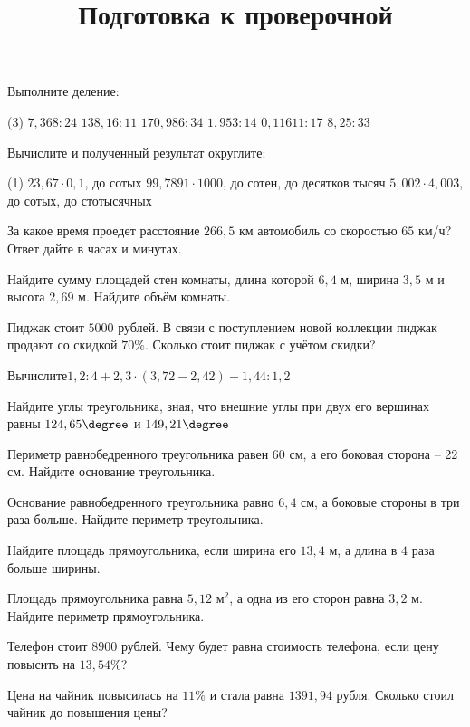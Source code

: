 \begin{homework}[number=3]
	\begin{listofex}
		\item Выполните деление:
		\begin{tasks}(3)
			\task \( 7,368: 24 \)
			\task \( 138,16:11 \) 
			\task \( 170,986:34 \)  
			\task \( 1,953:14 \)  
			\task \( 0,11611:17 \)  
			\task \( 8,25:33 \)  
		\end{tasks}
		\item Вычислите и полученный результат округлите: 
		\begin{tasks}(1)
			\task \( 23,67\cdot 0,1 \), до сотых
			\task \( 99,7891\cdot 1000  \), до сотен, до десятков тысяч
			\task \( 5,002 \cdot4,003 \), до сотых, до стотысячных
		\end{tasks}
		\item  За какое время проедет расстояние \( 266,5 \) км автомобиль со скоростью \( 65 \) км/ч? Ответ дайте в 
		часах и минутах.
		\item Найдите сумму площадей стен комнаты, длина которой \( 6,4 \) м, ширина \( 3,5 \) м и высота \( 2,69 \) м. Найдите объём комнаты.
		\item  Пиджак стоит \( 5000 \) рублей. В связи с поступлением новой коллекции пиджак продают со скидкой \( 70\% \). Сколько стоит пиджак с учётом скидки?
		
	\end{listofex}
\end{homework}

\begin{class}[number=7]
	\title{Подготовка к проверочной}
	\begin{listofex}
		\item Вычислите\( 1,2:4+2,3\cdot(3,72-2,42)-1,44:1,2 \) 
		\item Найдите углы треугольника, зная, что внешние углы при двух его вершинах равны \( 124,65\degree \) и \( 149,21\degree \)
		\item Периметр равнобедренного треугольника равен 60 см, а его боковая сторона – 22 см. Найдите основание треугольника.
		\item Основание равнобедренного треугольника равно \( 6,4 \) см, а боковые стороны в три раза больше. Найдите периметр треугольника.
		\item Найдите площадь прямоугольника, если ширина его \( 13,4 \) м, а длина в \( 4 \) раза больше ширины.
		\item Площадь прямоугольника равна \( 5,12 \) м\( ^{2} \), а одна из его сторон равна \( 3,2 \) м. Найдите периметр прямоугольника.
		\item Телефон стоит \( 8900 \) рублей. Чему будет равна стоимость телефона, если цену повысить на \( 13,54\% \)?
		\item Цена на чайник повысилась на \( 11\% \) и стала равна \( 1391,94  \) рубля. Сколько стоил чайник до повышения цены?
	\end{listofex}
\end{class}

